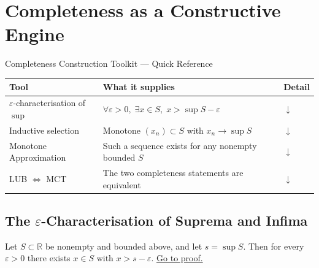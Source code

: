 
\section{Completeness as a Constructive Engine}
\label{sec:completeness-construction}

\begin{toolkitbox}{Completeness Construction Toolkit --- Quick Reference}
\small
\begin{tabular}{l l l}
\toprule
\textbf{Tool} & \textbf{What it supplies} & \textbf{Detail} \\
\midrule
$\varepsilon$-characterisation of $\sup$
  & $\forall\varepsilon>0,\;\exists x\in S,\;x>\sup S-\varepsilon$
  & \hyperref[prop:eps-char-sup]{$\downarrow$} \\[3pt]
Inductive selection
  & Monotone $(x_n)\subset S$ with $x_n\to\sup S$
  & \hyperref[thm:inductive-selection]{$\downarrow$} \\[3pt]
Monotone Approximation
  & Such a sequence exists for any nonempty bounded $S$
  & \hyperref[prop:monotone-approx-bounds]{$\downarrow$} \\[3pt]
LUB $\Leftrightarrow$ MCT
  & The two completeness statements are equivalent
  & \hyperref[thm:LUB-iff-MCT]{$\downarrow$} \\
\bottomrule
\end{tabular}
\end{toolkitbox}

\subsection*{\texorpdfstring{The $\varepsilon$-Characterisation of Suprema and Infima}{The epsilon-Characterisation of Suprema and Infima}}
\label{subsec:eps-char}

\begin{proposition}
\label{prop:eps-char-sup}
Let $S\subset\mathbb{R}$ be nonempty and bounded above, and let
$s=\sup S$. Then for every $\varepsilon>0$ there exists $x\in S$ with
$x>s-\varepsilon$.
\hyperref[prf:eps-char-sup]{Go to proof.}
\end{proposition}

